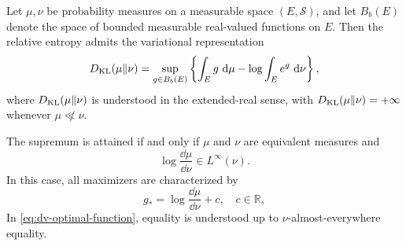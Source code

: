 \documentclass[12pt,a4paper,oneside]{book}
\begin{document}
\begin{theorem}
\label{thm:dv}
\label{src:p11q6}

Let $\mu,\nu$ be probability measures on a measurable space $(E,\mathcal S)$, and let $B_b(E)$ denote the space of bounded
measurable real-valued functions on $E$. Then the relative entropy admits the variational representation
\begin{equation}
    D_{\mathrm{KL}}(\mu\Vert\nu) = \sup_{g\in B_b(E)}
    \left\{
        \int_E g\,\,\mathrm{d}\mu - \log\int_E e^g\,\,\mathrm{d}\nu
    \right\},
    \label{eq:dv-variational}
\end{equation}
where $D_{\mathrm{KL}}(\mu\Vert\nu)$ is understood in the extended-real sense, with $D_{\mathrm{KL}}(\mu\Vert\nu)=+\infty$ whenever $\mu\not\ll\nu$.

The supremum is attained if and only if $\mu$ and $\nu$ are equivalent measures and
\begin{equation*}
    \log\frac{\dd\mu}{\dd\nu}\in L^\infty(\nu).
\end{equation*}
In this case, all maximizers are characterized by
\begin{equation}
    g_* = \log\frac{\dd\mu}{\dd\nu}+c, \quad c\in\mathbb R,
    \label{eq:dv-optimal-function}
\end{equation}
In \eqref{eq:dv-optimal-function}, equality is understood up to $\nu$-almost-everywhere equality.
\end{theorem}
\end{document}
